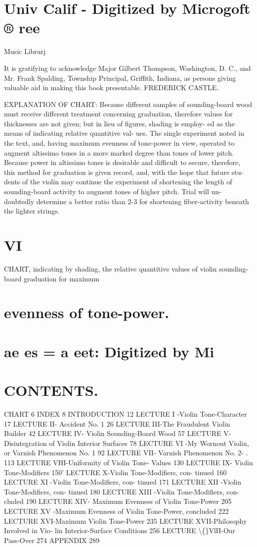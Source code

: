 \documentclass{article}
\begin{document}
\section*{Univ Calif - Digitized by Microgoft ® ree}
Music Librurj

It is gratifying to acknowledge Major Gilbert Thompson, Washington, D. C., and Mr. Frank Spalding, Township Principal, Griffith, Indiana, as persons giving valuable aid in making this book presentable. FREDERICK CASTLE.

EXPLANATION OF CHART: Because different samples of sounding-board wood must receive different treatment concerning graduation, therefore values for thicknesses are not given; but in lieu of figures, shading is employ- ed as the means of indicating relative quantitive val- ues. The single experiment noted in the text, and, having maximum evenness of tone-power in view, operated to augment altissimo tones in a more marked degree than tones of lower pitch. Because power in altissimo tones is desirable and difficult to secure, therefore, this method for graduation is given record, and, with the hope that future stu- dents of the violin may continue the experiment of shortening the length of sounding-board activity to augment tones of higher pitch. Trial will un- doubtedly determine a better ratio than 2-3 for shortening fiber-activity beneath the lighter strings.

\section*{VI}
CHART, indicating by shading, the relative quantitive values of violin sounding-board graduation for maximum

\section*{evenness of tone-power.}
\section*{ae es = a eet: Digitized by Mi}
\section*{CONTENTS.}
CHART 6 INDEX 8 INTRODUCTION 12 LECTURE I -Violin Tone-Character 17 LECTURE II- Accident No. 1 26 LECTURE III-The Fraudulent Violin Builder 42 LECTURE IV- Violin Sounding-Board Wood 57 LECTURE V-Disintegration of Violin Interior Surfaces 78 LECTURE VI -My Wornout Violin, or Varnish Phenomenon No. 1 92 LECTURE VII- Varnish Phenomenon No. 2- . 113 LECTURE VHI-Uniformity of Violin Tone- Values 130 LECTURE IX- Violin Tone-Modifiers 150' LECTURE X-Violin Tone-Modifiers, con- tinued 160 LECTURE XI -Violin Tone-Modifiers, con- tinued 171 LECTURE XII -Violin Tone-Modifiers, con- tinued 180 LECTURE XIII -Violin Tone-Modifiers, con- cluded 190 LECTURE XIV- Maximum Evenness of Violin Tone-Power 205 LECTURE XV -Maximum Evenness of Violin Tone-Power, concluded 222 LECTURE XVI-Maximum Violin Tone-Power 235 LECTURE XVII-Philosophy Involved in Vio- lin Interior-Surface Conditions 256 LECTURE \textbackslash\{\}VlII-Our Pass-Over 274 APPENDIX 289
\end{document}
